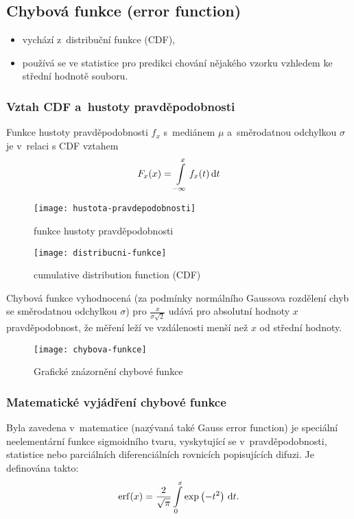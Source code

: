 
\subsection{Chybová funkce (error function)}\label{sec:chybova-funkce}
\begin{itemize}
	\item vychází z~distribuční funkce (CDF),
	\item používá se ve statistice pro predikci chování nějakého vzorku vzhledem ke střední hodnotě souboru.
\end{itemize}

\subsubsection{Vztah CDF a~hustoty pravděpodobnosti}
Funkce hustoty pravděpodobnosti $f_x$ s~mediánem $\mu$ a~směrodatnou odchylkou $\sigma$ je v~relaci s CDF vztahem
\begin{equation}
	F_x(x) = \int\limits_{-\infty}^x f_x(t) \,\mathrm{d} t
\end{equation}

\begin{figure}[H]
	\centering
	\texttt{[image: hustota-pravdepodobnosti]}
	\caption{funkce hustoty pravděpodobnosti}
	\label{fig:hustota-pravdepodobnosti}
\end{figure}

\begin{figure}[H]
	\centering
	\texttt{[image: distribucni-funkce]}
	\caption{cumulative distribution function (CDF)}
	\label{fig:distribucni-funkce}
\end{figure}

Chybová funkce vyhodnocená (za podmínky normálního Gaussova rozdělení chyb se směrodatnou odchylkou $\sigma$) pro $\tfrac{x}{\sigma \sqrt{2}}$ udává pro absolutní hodnoty $x$ pravděpodobnost, že měření leží ve vzdálenosti menší než $x$ od střední hodnoty.
\begin{figure}[H]
	\centering
	\texttt{[image: chybova-funkce]}
	\caption{Grafické znázornění chybové funkce}
	\label{fig:chybova-funkce}
\end{figure}

\subsubsection{Matematické vyjádření chybové funkce}
Byla zavedena v~matematice (nazývaná také Gauss error function) je speciální neelementární funkce sigmoidního tvaru, vyskytující se v~pravděpodobnosti, statistice nebo parciálních diferenciálních rovnicích popisujících difuzi.
Je definována takto:
\begin{equation}
	\mathrm{erf}(x) = \frac{2}{\sqrt{\pi}} \int\limits_0^x \exp\left(-t^2\right) \,\mathrm{d} t.
\end{equation}

